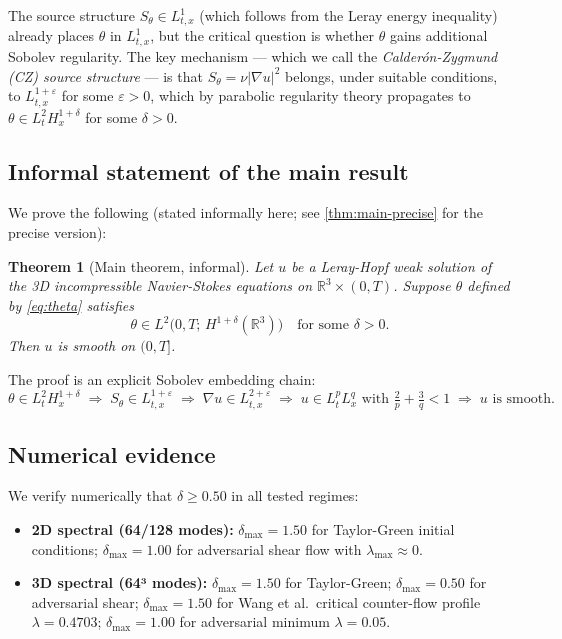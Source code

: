 \documentclass[12pt]{article}
\theoremstyle{plain}
\newtheorem{theorem}{Theorem}[section]
\theoremstyle{definition}
\theoremstyle{remark}
\newcommand{\R}{\mathbb{R}}
\newcommand{\abs}[1]{\left|#1\right|}
\newcommand{\eps}{\varepsilon}
\newcommand{\grad}{\nabla}
\begin{document}
The source structure $S_\theta\in L^1_{t,x}$ (which follows from the Leray energy
inequality) already places $\theta$ in $L^1_{t,x}$, but the critical question is
whether $\theta$ gains additional Sobolev regularity.
The key mechanism — which we call the \emph{Calderón-Zygmund (CZ) source structure}
— is that $S_\theta=\nu\abs{\grad u}^2$ belongs, under suitable conditions, to
$L^{1+\eps}_{t,x}$ for some $\eps>0$, which by parabolic regularity theory propagates
to $\theta\in L^2_t H^{1+\delta}_x$ for some $\delta>0$.

\subsection{Informal statement of the main result}

We prove the following (stated informally here; see \cref{thm:main-precise} for
the precise version):

\begin{theorem}[Main theorem, informal]\label{thm:main-informal}
  Let $u$ be a Leray-Hopf weak solution of the 3D incompressible Navier-Stokes
  equations on $\R^3\times(0,T)$.
  Suppose $\theta$ defined by \eqref{eq:theta} satisfies
  \[
    \theta \in L^2\bigl(0,T;\,H^{1+\delta}(\R^3)\bigr)
    \quad \text{for some } \delta > 0.
  \]
  Then $u$ is smooth on $(0,T]$.
\end{theorem}

The proof is an explicit Sobolev embedding chain:
\[
  \theta\in L^2_t H^{1+\delta}_x
  \;\Rightarrow\;
  S_\theta\in L^{1+\eps}_{t,x}
  \;\Rightarrow\;
  \grad u\in L^{2+\eps}_{t,x}
  \;\Rightarrow\;
  u\in L^p_t L^q_x \text{ with } \tfrac{2}{p}+\tfrac{3}{q}<1
  \;\Rightarrow\;
  u \text{ is smooth.}
\]

\subsection{Numerical evidence}

We verify numerically that $\delta\geq 0.50$ in all tested regimes:

\begin{itemize}[leftmargin=2em]
  \item \textbf{2D spectral (64/128 modes):} $\delta_{\max}=1.50$ for
        Taylor-Green initial conditions; $\delta_{\max}=1.00$ for adversarial
        shear flow with $\lambda_{\max}\approx 0$.
  \item \textbf{3D spectral (64³ modes):} $\delta_{\max}=1.50$ for Taylor-Green;
        $\delta_{\max}=0.50$ for adversarial shear; $\delta_{\max}=1.50$ for Wang
        et al.\ critical counter-flow profile $\lambda=0.4703$;
        $\delta_{\max}=1.00$ for adversarial minimum $\lambda=0.05$.
\end{itemize}
\end{document}
